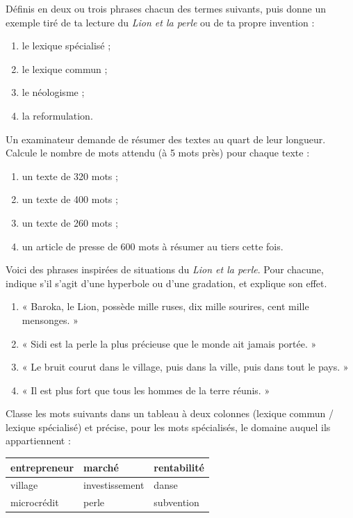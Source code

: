 \documentclass[11pt]{article}
\newcommand{\cle}[1]{{\popxbold\color{popdark}#1}}
\newcounter{popsec}
\newcounter{popsub}
\newcommand{\courssub}[1]{%
  \stepcounter{popsub}%
  \par\vspace{9pt}\noindent{\popxbold\fontsize{11.5}{13}\selectfont\color{popink}{\color{poporange}\thepopsec.\thepopsub}\hspace{6pt}#1}\par\nopagebreak\vspace{4pt}
}
\begin{document}
\begin{exercice}[Définitions]
Définis en deux ou trois phrases chacun des termes suivants, puis donne un exemple tiré de ta lecture du \emph{Lion et la perle} ou de ta propre invention :
\begin{enumerate}
\item le \cle{lexique spécialisé} ;
\item le \cle{lexique commun} ;
\item le \cle{néologisme} ;
\item la \cle{reformulation}.
\end{enumerate}
\end{exercice}

\begin{exercice}
Un examinateur demande de résumer des textes au quart de leur longueur. Calcule le nombre de mots attendu (à 5 mots près) pour chaque texte :
\begin{enumerate}
\item un texte de 320 mots ;
\item un texte de 400 mots ;
\item un texte de 260 mots ;
\item un article de presse de 600 mots à résumer au tiers cette fois.
\end{enumerate}
\end{exercice}

\courssub{Je m'entraîne}

\begin{exercice}
Voici des phrases inspirées de situations du \emph{Lion et la perle}. Pour chacune, indique s'il s'agit d'une hyperbole ou d'une gradation, et explique son effet.
\begin{enumerate}
\item « Baroka, le Lion, possède mille ruses, dix mille sourires, cent mille mensonges. »
\item « Sidi est la perle la plus précieuse que le monde ait jamais portée. »
\item « Le bruit courut dans le village, puis dans la ville, puis dans tout le pays. »
\item « Il est plus fort que tous les hommes de la terre réunis. »
\end{enumerate}
\end{exercice}

\begin{exercice}
Classe les mots suivants dans un tableau à deux colonnes (lexique commun / lexique spécialisé) et précise, pour les mots spécialisés, le domaine auquel ils appartiennent :
\begin{center}
\begin{tabularx}{\linewidth}{|X|X|X|}
\hline
\rowcolor{popblueL} entrepreneur & marché & rentabilité \\
\hline
village & investissement & danse \\
\hline
microcrédit & perle & subvention \\
\hline
\end{tabularx}
\end{center}
\end{exercice}
\end{document}

